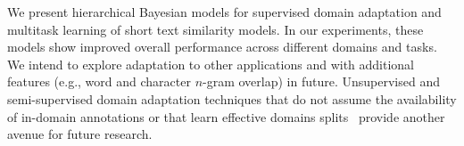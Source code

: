 We present hierarchical Bayesian models for supervised domain
adaptation and multitask learning of short text similarity models. In
our experiments, these models show improved overall performance across
different domains and tasks.  We intend to explore adaptation to
other \sts{} applications and with additional \sts{} features (e.g.,
word and character $n$-gram overlap) in future.  Unsupervised and
semi-supervised domain adaptation techniques that do not assume the
availability of in-domain annotations or that learn effective domains
splits~\cite{Hu:Zhai:Eidelman:Boyd-Graber-2014} provide another avenue
for future research.


